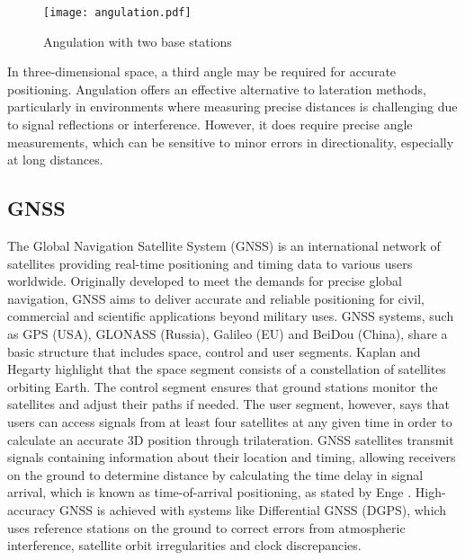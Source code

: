 \begin{figure}[htbp]
    \centering
    \texttt{[image: angulation.pdf]}
    \caption{Angulation with two base stations \cite{kupper2005location}}
    \label{fig:angulation}
\end{figure}

In three-dimensional space, a third angle may be required for accurate positioning. Angulation offers an effective alternative to lateration methods, particularly in environments where measuring precise distances is challenging due to signal reflections or interference. However, it does require precise angle measurements, which can be sensitive to minor errors in directionality, especially at long distances.

\subsection{GNSS}
The Global Navigation Satellite System (GNSS) is an international network of satellites providing real-time positioning and timing data to various users worldwide. Originally developed to meet the demands for precise global navigation, GNSS aims to deliver accurate and reliable positioning for civil, commercial and scientific applications beyond military uses. GNSS systems, such as GPS (USA), GLONASS (Russia), Galileo (EU) and BeiDou (China), share a basic structure that includes space, control and user segments. Kaplan and Hegarty \cite{kaplan2017understanding} highlight that the space segment consists of a constellation of satellites orbiting Earth. The control segment ensures that ground stations monitor the satellites and adjust their paths if needed. The user segment, however, says that users can access signals from at least four satellites at any given time in order to calculate an accurate 3D position through trilateration.
GNSS satellites transmit signals containing information about their location and timing, allowing receivers on the ground to determine distance by calculating the time delay in signal arrival, which is known as time-of-arrival positioning, as stated by Enge \cite{enge1994global}. High-accuracy GNSS is achieved with systems like Differential GNSS (DGPS), which uses reference stations on the ground to correct errors from atmospheric interference, satellite orbit irregularities and clock discrepancies.


